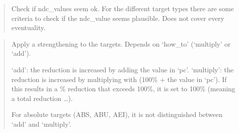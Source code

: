 \documentclass[letterpaper,10pt,english]{sphinxmanual}
\begin{document}
\begin{quote}

Check if ndc\_values seem ok.
For the different target types there are some criteria to check if the ndc\_value seems plausible.
Does not cover every eventuality.
\end{quote}

\begin{quote}

Apply a strengthening to the targets.
Depends on ‘how\_to’ (‘multiply’ or ‘add’).

‘add’: the reduction is increased by adding the value in ‘pc’.
‘multiply’: the reduction is increased by multiplying with (100\% + the value in ‘pc’).
If this results in a \% reduction that exceeds 100\%, it is set to 100\% (meaning a total
reduction …).

For absolute targets (ABS, ABU, AEI), it is not distinguished between ‘add’ and ‘multiply’.
\end{quote}
\end{document}

